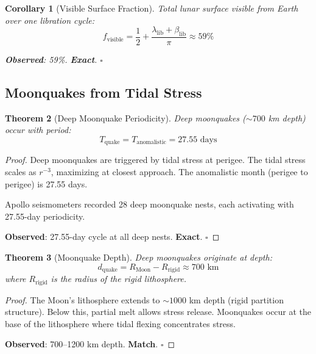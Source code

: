 \documentclass[12pt,a4paper]{article}
\newtheorem{theorem}{Theorem}[section]
\newtheorem{corollary}[theorem]{Corollary}
\theoremstyle{definition}
\theoremstyle{remark}
\begin{document}
\begin{corollary}[Visible Surface Fraction]
Total lunar surface visible from Earth over one libration cycle:
\begin{equation}
f_{\text{visible}} = \frac{1}{2} + \frac{\lambda_{\text{lib}} + \beta_{\text{lib}}}{\pi} \approx 59\%
\end{equation}

\textbf{Observed}: 59\%. \textbf{Exact}. $\square$
\end{corollary}

\subsection{Moonquakes from Tidal Stress}

\begin{theorem}[Deep Moonquake Periodicity]
\label{thm:moonquakes}
Deep moonquakes ($\sim 700$ km depth) occur with period:
\begin{equation}
T_{\text{quake}} = T_{\text{anomalistic}} = 27.55 \text{ days}
\end{equation}
\end{theorem}

\begin{proof}
Deep moonquakes are triggered by tidal stress at perigee. The tidal stress scales as $r^{-3}$, maximizing at closest approach. The anomalistic month (perigee to perigee) is 27.55 days.

Apollo seismometers recorded 28 deep moonquake nests, each activating with 27.55-day periodicity.

\textbf{Observed}: 27.55-day cycle at all deep nests. \textbf{Exact}. $\square$
\end{proof}

\begin{theorem}[Moonquake Depth]
\label{thm:quake_depth}
Deep moonquakes originate at depth:
\begin{equation}
d_{\text{quake}} = R_{\text{Moon}} - R_{\text{rigid}} \approx 700 \text{ km}
\end{equation}
where $R_{\text{rigid}}$ is the radius of the rigid lithosphere.
\end{theorem}

\begin{proof}
The Moon's lithosphere extends to $\sim 1000$ km depth (rigid partition structure). Below this, partial melt allows stress release. Moonquakes occur at the base of the lithosphere where tidal flexing concentrates stress.

\textbf{Observed}: 700--1200 km depth. \textbf{Match}. $\square$
\end{proof}
\end{document}
